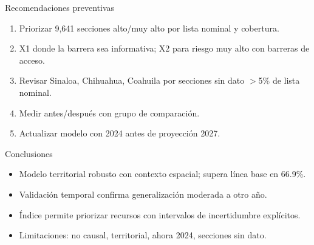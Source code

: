 \documentclass[aspectratio=169]{beamer}
\begin{document}
\begin{frame}{Recomendaciones preventivas}
\begin{enumerate}
\item Priorizar 9,641 secciones alto/muy alto por lista nominal y cobertura.
\item X1 donde la barrera sea informativa; X2 para riesgo muy alto con barreras de acceso.
\item Revisar Sinaloa, Chihuahua, Coahuila por secciones sin dato $>$5\% de lista nominal.
\item Medir antes/después con grupo de comparación.
\item Actualizar modelo con 2024 antes de proyección 2027.
\end{enumerate}
\end{frame}

\begin{frame}{Conclusiones}
\begin{itemize}
\item Modelo territorial robusto con contexto espacial; supera línea base en 66.9\%.
\item Validación temporal confirma generalización moderada a otro año.
\item Índice permite priorizar recursos con intervalos de incertidumbre explícitos.
\item Limitaciones: no causal, territorial, ahora 2024, secciones sin dato.
\end{itemize}
\end{frame}
\end{document}
